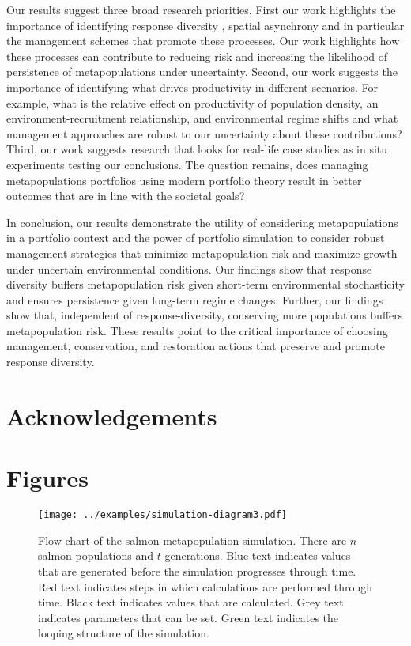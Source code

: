 Our results suggest three broad research priorities. First our work highlights the importance of identifying response diversity \citep[e.g.][]{eliason2011}, spatial asynchrony \citep[e.g.][]{thorson2013} and in particular the management schemes that promote these processes. Our work highlights how these processes can contribute to reducing risk and increasing the likelihood of persistence of metapopulations under uncertainty. Second, our work suggests the importance of identifying what drives productivity in different scenarios. For example, what is the relative effect on productivity of population density, an environment-recruitment relationship, and environmental regime shifts \citep{vert-pre2013} and what management approaches are robust to our uncertainty about these contributions? Third, our work suggests research that looks for real-life case studies as in situ experiments testing our conclusions. The question remains, does managing metapopulations portfolios using modern portfolio theory result in better outcomes that are in line with the societal goals?

In conclusion, our results demonstrate the utility of considering metapopulations in a portfolio context and the power of portfolio simulation to consider robust management strategies that minimize metapopulation risk and maximize growth under uncertain environmental conditions. Our findings show that response diversity buffers metapopulation risk given short-term environmental stochasticity and ensures persistence given long-term regime changes. Further, our findings show that, independent of response-diversity, conserving more populations buffers metapopulation risk. These results point to the critical importance of choosing management, conservation, and restoration actions that preserve and promote response diversity.

\section{Acknowledgements}





\clearpage

\section{Figures}

\clearpage

\begin{figure}[htbp]
\centering
\texttt{[image: ../examples/simulation-diagram3.pdf]}
\caption{Flow chart of the salmon-metapopulation simulation. There are $n$ salmon populations and $t$ generations. Blue text indicates values that are generated before the simulation progresses through time. Red text indicates steps in which calculations are performed through time. Black text indicates values that are calculated. Grey text indicates parameters that can be set. Green text indicates the looping structure of the simulation.}
\label{f:sim-flow}
\end{figure}

